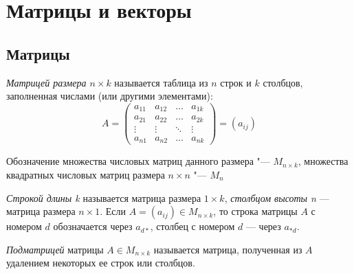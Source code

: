 \section{Матрицы и векторы}

\subsection{Матрицы}

\begin{definition}
	\textit{Матрицей размера $n \times k$} называется таблица из $n$ строк и $k$ столбцов, заполненная числами (или другими элементами):
	\[A = 
	\begin{pmatrix}
	a_{11} & a_{12} & \dots & a_{1k} \\
	a_{21} & a_{22} & \dots & a_{2k} \\
	\vdots & \vdots & \ddots & \vdots \\
	a_{n1} & a_{n2} & \dots & a_{nk}
	\end{pmatrix}
	= (a_{ij})\]
	
	Обозначение множества числовых матриц данного размера "--- $M_{n \times k}$, множества квадратных числовых матриц размера $n \times n$ "--- $M_{n}$
\end{definition}

\begin{definition}
	\textit{Строкой длины k} называется матрица размера $1 \times k$, \textit{столбцом высоты n} --- матрица размера $n \times 1$. Если $A = (a_{ij}) \in M_{n \times k}$, то строка матрицы $A$ с номером $d$ обозначается через $a_{d*}$, столбец с номером $d$ --- через $a_{*d}$.
\end{definition}

\begin{definition}
	\textit{Подматрицей} матрицы $A \in M_{n \times k}$ называется матрица, полученная из $A$ удалением некоторых ее строк или столбцов.
\end{definition}

